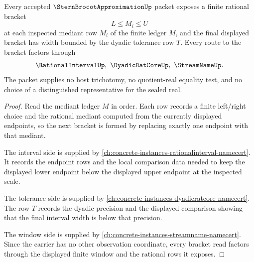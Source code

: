 \begin{theorem}\label{thm:stern-brocot-approximation-finite-rational-bracketing}
Every accepted $\SternBrocotApproximationUp$ packet exposes a finite rational bracket
$$
L \leq M_i \leq U
$$
at each inspected mediant row $M_i$ of the finite ledger $M$, and the final displayed bracket has width bounded by the dyadic tolerance row $T$. Every route to the bracket factors through
$$
\RationalIntervalUp,\ \DyadicRatCoreUp,\ \StreamNameUp .
$$
The packet supplies no host trichotomy, no quotient-real equality test, and no choice of a distinguished representative for the sealed real.
\end{theorem}
\begin{proof}
Read the mediant ledger $M$ in order. Each row records a finite left/right choice and the rational mediant computed from the currently displayed endpoints, so the next bracket is formed by replacing exactly one endpoint with that mediant.

The interval side is supplied by \autoref{ch:concrete-instances-rationalinterval-namecert}. It records the endpoint rows and the local comparison data needed to keep the displayed lower endpoint below the displayed upper endpoint at the inspected scale.

The tolerance side is supplied by \autoref{ch:concrete-instances-dyadicratcore-namecert}. The row $T$ records the dyadic precision and the displayed comparison showing that the final interval width is below that precision.

The window side is supplied by \autoref{ch:concrete-instances-streamname-namecert}. Since the carrier has no other observation coordinate, every bracket read factors through the displayed finite window and the rational rows it exposes.
\end{proof}

